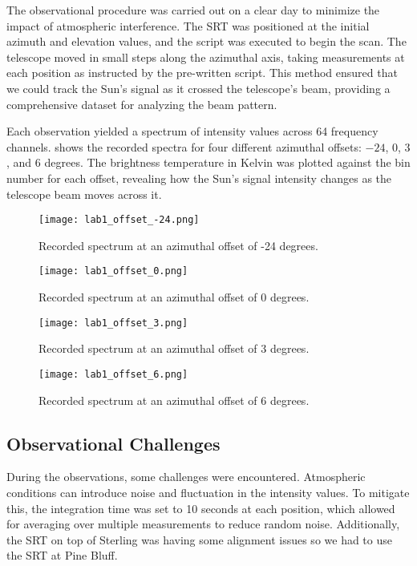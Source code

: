 \documentclass[linenumbers,twocolumn]{aastex631}
\begin{document}
The observational procedure was carried out on a clear day to minimize the impact of atmospheric interference. The SRT was positioned at the initial azimuth and elevation values, and the script was executed to begin the scan. The telescope moved in small steps along the azimuthal axis, taking measurements at each position as instructed by the pre-written script. This method ensured that we could track the Sun’s signal as it crossed the telescope’s beam, providing a comprehensive dataset for analyzing the beam pattern.

Each observation yielded a spectrum of intensity values across 64 frequency channels. shows the recorded spectra for four different azimuthal offsets: \(-24\), \(0\), \(3\), and \(6\) degrees. The brightness temperature in Kelvin was plotted against the bin number for each offset, revealing how the Sun’s signal intensity changes as the telescope beam moves across it.

\begin{figure}[h]
    \centering
    \texttt{[image: lab1\_offset\_-24.png]}
    \caption{Recorded spectrum at an azimuthal offset of -24 degrees.}
    \label{fig:offset_-24}
\end{figure}
    
\begin{figure}[h]
    \centering
    \texttt{[image: lab1\_offset\_0.png]}
    \caption{Recorded spectrum at an azimuthal offset of 0 degrees.}
    \label{fig:offset_0}
\end{figure}
    
\begin{figure}[h]
    \centering
    \texttt{[image: lab1\_offset\_3.png]}
    \caption{Recorded spectrum at an azimuthal offset of 3 degrees.}
    \label{fig:offset_3}
\end{figure}

\begin{figure}[h]
    \centering
    \texttt{[image: lab1\_offset\_6.png]}
    \caption{Recorded spectrum at an azimuthal offset of 6 degrees.}
    \label{fig:offset_6}
\end{figure}

\subsection{Observational Challenges}

During the observations, some challenges were encountered. Atmospheric conditions can introduce noise and fluctuation in the intensity values. To mitigate this, the integration time was set to 10 seconds at each position, which allowed for averaging over multiple measurements to reduce random noise. Additionally, the SRT on top of Sterling was having some alignment issues so we had to use the SRT at Pine Bluff.
\end{document}
